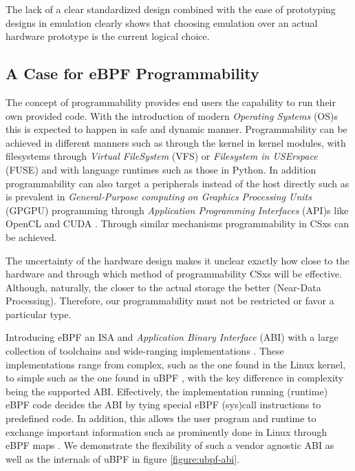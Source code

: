 The lack of a clear standardized design combined with the ease of prototyping
designs in emulation clearly shows that choosing emulation over an actual
hardware prototype is the current logical choice.

\subsection{A Case for eBPF Programmability}

The concept of programmability provides end users the capability to run their
own provided code. With the introduction of modern \textit{Operating Systems}
(OS)s this is expected to happen in safe and dynamic manner. Programmability
can be achieved in different manners such as through the kernel in kernel
modules, with filesystems through \textit{Virtual FileSystem} (VFS) \cite{vfs}
or \textit{Filesystem in USErspace} (FUSE) \cite{fuse} and with language
runtimes such as those in Python. In addition programmability can also target a
peripherals instead of the host directly such as is prevalent in
\textit{General-Purpose computing on Graphics Processing Units} (GPGPU)
programming through \textit{Application Programming Interfaces} (API)s like
OpenCL \cite{opencl} and CUDA \cite{cuda}. Through similar mechanisms
programmability in CSxs can be achieved.

The uncertainty of the hardware design makes it unclear exactly how close to the
hardware and through which method of programmability CSxs will be effective.
Although, naturally, the closer to the actual storage the better
(Near-Data Processing). Therefore, our programmability must not be restricted or
favor a particular type.

Introducing eBPF an ISA and \textit{Application Binary Interface} (ABI) with a
large collection of toolchains and wide-ranging implementations
\cite{what-ebpf, McCanne1993TheBP}. These implementations range from complex,
such as the one found in the Linux kernel, to simple such as the one found in
uBPF \cite{ubpf}, with the key difference in complexity being the supported ABI.
Effectively, the implementation running (runtime) eBPF code decides the ABI by
tying special eBPF (sys)call instructions to predefined code. In addition, this
allows the user program and runtime to exchange important information such as
prominently done in Linux through eBPF maps \cite{bpf-man}. We demonstrate the
flexibility of such a vendor agnostic ABI as well as the internals of uBPF in
figure \ref{figure:ubpf-abi}.

